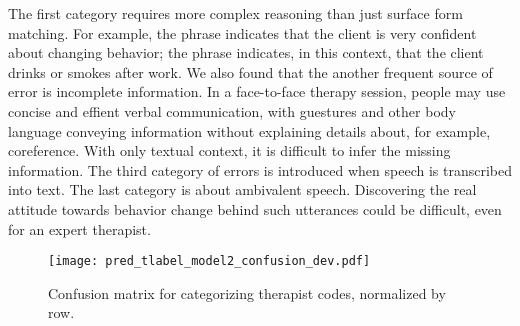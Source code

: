The first category requires more complex reasoning than just surface
form matching. For example, the phrase 
indicates that the client is very confident about changing behavior;
the phrase  indicates, in this context,
that the client drinks or smokes after work. We also found that the
another frequent source of error is incomplete information. In a
face-to-face therapy session, people may use concise and effient
verbal communication, with guestures and other body language conveying
information without explaining details about, for example,
coreference.  With only textual context, it is difficult to infer the
missing information. The third category of errors is introduced when
speech is transcribed into text. The last category is about ambivalent
speech. Discovering the real attitude towards behavior change behind
such utterances could be difficult, even for an expert therapist.
\begin{figure}[!th]
\centering

  \texttt{[image: pred\_tlabel\_model2\_confusion\_dev.pdf]}
  \caption{\label{fig:categorizing_confusion_therapist} Confusion matrix for categorizing therapist codes, normalized by row.}
\end{figure}

